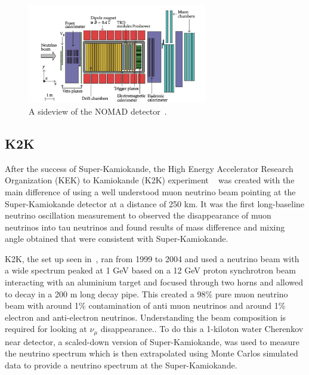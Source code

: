 \begin{figure}[h!]
\centering
  \centering
\includegraphics[width=0.7\textwidth]{figures/NOMAD2.jpeg}
\vspace{2mm}
\caption{A sideview of the NOMAD detector~\cite{69NOMAD}.}
\label{fig:NOMAD}
\end{figure}

\subsection{K2K}
After the success of Super-Kamiokande, the High Energy Accelerator Research Organization (KEK) to Kamiokande (K2K) experiment ~\cite{22K2K} was created with the main difference of using a well understood muon neutrino beam pointing at the Super-Kamiokande detector at a distance of 250 km. It was the first long-baseline neutrino oscillation measurement to observed the disappearance of muon neutrinos into tau neutrinos and found results of mass difference and mixing angle obtained that were consistent with Super-Kamiokande.

K2K, the set up seen in~, ran from 1999 to 2004 and used a neutrino beam with a wide spectrum peaked at 1 GeV based on a 12 GeV proton synchrotron beam interacting with an aluminium target and focused through two horns and allowed to decay in a 200 m long decay pipe. This created a 98\% pure muon neutrino beam with around 1\% contamination of anti muon neutrinos and around 1\% electron and anti-electron neutrinos. Understanding the beam composition is required for looking at $\nu_\mu$ disappearance.. To do this a 1-kiloton water Cherenkov near detector,  a scaled-down version of Super-Kamiokande, was used to measure the neutrino spectrum which is then extrapolated using Monte Carlos simulated data to provide a neutrino spectrum at the Super-Kamiokande.

